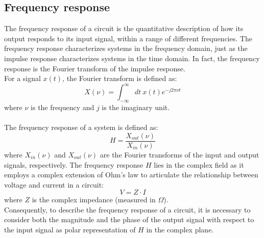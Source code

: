 	\subsection{Frequency response}
		The frequency response of a circuit is the quantitative description of how its output responds to its input signal, within a range of different frequencies.
		The frequency response characterizes systems in the frequency domain, just as the impulse response characterizes systems in the time domain. 
		In fact, the frequency response is the Fourier transform of the impulse response. \\
		For a signal $x(t)$, the Fourier transform is defined as: $$ X(\nu) = \int_{-\infty}^{\infty} dt \ x(t) e^{-j 2 \pi \nu t} $$ where $\nu$ is the frequency and $j$ is the imaginary unit. \\\\
		The frequency response of a system is defined as: $$ H = \frac{X_{out}(\nu)}{X_{in}(\nu)} $$ where $X_{in}(\nu)$ and $X_{out}(\nu)$ are the Fourier transforms of the input and output signals, respectively.
		The frequency response $H$ lies in the complex field as it employs a complex extension of Ohm's law to articulate the relationship between voltage and current in a circuit:
		$$V = Z \cdot I$$ \noindent where $Z$ is the complex impedance (measured in $\Omega$). \\
		Consequently, to describe the frequency response of a circuit, it is necessary to consider both the magnitude and the phase of the output signal with respect to the input signal as polar representation of $H$ in the complex plane.

	\newpage
